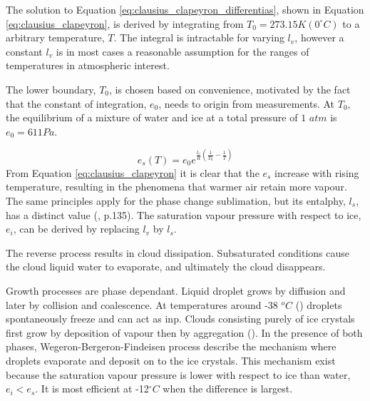 The solution to Equation \eqref{eq:clausius_clapeyron_differentias}, shown in Equation \eqref{eq:clausius_clapeyron}, is derived by integrating from $T_0 = 273.15K \left(0 ^{\circ}C \right)$ to a arbitrary temperature, $T$. The integral is intractable for varying $l_v$, however a constant $l_v$ is in most cases a reasonable assumption for the ranges of temperatures in atmospheric interest.

The lower boundary, $T_0$, is chosen based on convenience, motivated by the fact that the constant of integration,  $e_0$, needs to origin from measurements. At $T_0$, the equilibrium of a mixture of water and ice at a total pressure of $1$ $atm$ is $e_0 = 611Pa$. 

\begin{equation} \label{eq:clausius_clapeyron}
    e_s\left( T \right) = e_0 e^{\frac{l_v}{R} \left( \frac{1}{T_0} - \frac{1}{T} \right) }
\end{equation}
From Equation \eqref{eq:clausius_clapeyron} it is clear that the $e_s$ increase with rising temperature, resulting in the phenomena that warmer air retain more vapour. The same principles apply for the phase change sublimation, but its entalphy, $l_s$, has a distinct value (\cite{cloud_phys_book_johanne}, p.135). The saturation vapour pressure with respect to ice, $e_i$, can be derived by replacing $l_v$ by $l_s$.

The reverse process results in cloud dissipation. Subsaturated conditions cause the cloud liquid water to evaporate, and ultimately the cloud disappears. 

Growth processes are phase dependant. Liquid droplet grows by diffusion and later by collision and coalescence. At temperatures around -38 $^oC$ (\cite{lohmann2016}) droplets spontaneously freeze and can act as \acrshort{inp}. Clouds consisting purely of ice crystals first grow by deposition of vapour then by aggregation (\cite{Fowler1996LiquidAssumptions}). In the presence of both phases, Wegeron-Bergeron-Findeisen process describe the mechanism where droplets evaporate and deposit on to the ice crystals. %
This mechanism exist because the saturation vapour pressure is lower with respect to ice than water, $e_i < e_s$. It is most efficient at -12$^{\circ}C$ when the difference is largest.

